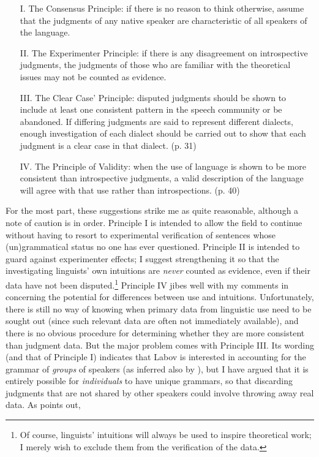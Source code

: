  \begin{itemize}
 \item[I.] The Consensus Principle: if there is no reason to think otherwise, assume that the judgments  of any native speaker are characteristic of all speakers of the language.

 \item[II.] The Experimenter Principle: if there is any disagreement on introspective judgments,  the judgments  of those who are familiar with the theoretical issues may not be counted as evidence.

 \item[III.] The Clear Case' Principle: disputed judgments  should be shown to include at least one consistent pattern in the speech community or be abandoned. If differing judgments  are said to represent different dialects, enough investigation of each dialect should be carried out to show that each judgment  is a clear case in that dialect. (p. 31)

 \item[IV.] The Principle of Validity: when the use of language is shown to be more consistent than introspective judgments,  a valid description of the language will agree with that use rather than introspections.  (p. 40)
 \end{itemize}

 \noindent
 For the most part, these suggestions strike me as quite reasonable, although a note of caution is in order. Principle I is intended to allow the field to continue without having to resort to experimental verification of sentences whose (un)grammatical status no one has ever questioned. Principle II is intended to guard against   experimenter effects; I suggest strengthening it so that the investigating linguists' own intuitions are \textit{never} counted as evidence, even if their data have not been disputed.\footnote{Of course, linguists' intuitions will always be used to inspire theoretical work; I merely wish to exclude them from the verification of the data.}
 Principle IV jibes well with my comments in  concerning the potential for differences between use and intuitions. Unfortunately, there is still no way of knowing when primary data from linguistic use need to be sought out (since such relevant data are often not immediately available), and there is no obvious procedure for determining whether they are more consistent than judgment data. But the major problem comes with Principle III. Its wording (and that of Principle I) indicates that Labov is interested in accounting for the grammar of \textit{groups} of speakers (as inferred also by \citet{Newmeyer1983}), but I have argued that it is entirely possible for \textit{individuals} to have unique grammars, so that discarding judgments that are not shared by other speakers could involve throwing away real data. As \citet{Ringen1979} points out,

